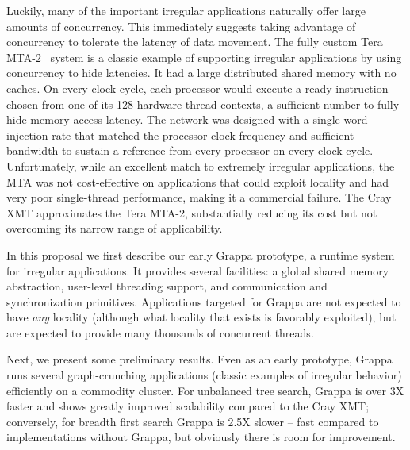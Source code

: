 
Luckily, many of the important irregular applications naturally offer large
amounts of concurrency. This immediately suggests taking advantage of
concurrency to tolerate the latency of data movement. The fully custom Tera
MTA-2~\cite{tera:mta1} system is a classic example of supporting irregular
applications by using concurrency to hide latencies. It had a large
distributed shared memory with no caches. On every clock cycle, each processor
would execute a ready instruction chosen from one of its 128 hardware thread
contexts, a sufficient number to fully hide memory access latency. The network
was designed with a single word injection rate that matched the processor
clock frequency and sufficient bandwidth to sustain a reference from every
processor on every clock cycle. Unfortunately, while an excellent match to
extremely irregular applications, the MTA was not cost-effective on
applications that could exploit locality and had very poor single-thread
performance, making it a commercial failure. The Cray XMT approximates the
Tera MTA-2, substantially reducing its cost but not overcoming its narrow
range of applicability.

In this proposal we first describe our early
Grappa prototype, a runtime system for irregular
applications. It provides several facilities: a global shared memory
abstraction, user-level threading support, and communication and
synchronization primitives. Applications targeted for Grappa are not expected
to have \emph{any} locality (although what locality that exists is favorably
exploited), but are expected to provide many thousands of concurrent threads.

Next, we present some preliminary results. Even as an early prototype, Grappa
runs several graph-crunching applications (classic examples of irregular
behavior) efficiently on a commodity cluster. For unbalanced tree search,
Grappa is over 3X faster and shows greatly improved scalability compared to
the Cray XMT; conversely, for breadth first search Grappa is 2.5X slower --
fast compared to implementations without Grappa, but obviously there is room
for improvement. 

